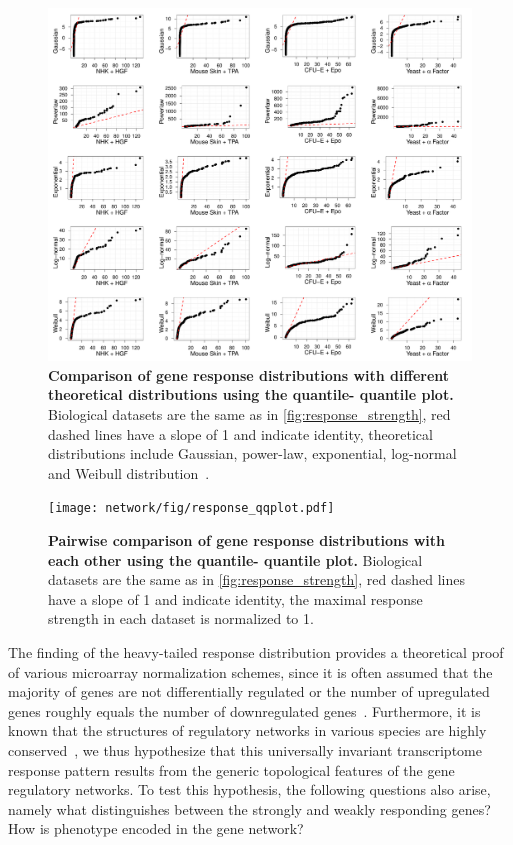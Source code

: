 \begin{figure}[!ht]
\begin{center}
\includegraphics[width=\textwidth]{network/fig/response_fit.pdf}
\end{center}
\caption[Comparison of gene response distributions with
theoretical distributions]{
{\bf Comparison of gene response distributions with 
different theoretical distributions using the quantile-%
quantile plot.}
Biological datasets are the same as in 
\ref{fig:response_strength}, red dashed lines have a slope
of 1 and indicate identity, theoretical distributions 
include Gaussian, power-law, exponential, log-normal and
Weibull distribution~\citep{Clauset2009}.
}
\label{fig:response_fit}
\end{figure}

\begin{figure}[!ht]
\begin{center}
\texttt{[image: network/fig/response\_qqplot.pdf]}
\end{center}
\caption[Comparison of gene response distributions]{
{\bf Pairwise comparison of gene response distributions with 
each other using the quantile-%
quantile plot.} 
Biological datasets are the same as in 
\ref{fig:response_strength}, red dashed lines have a slope
of 1 and indicate identity, the maximal response strength
in each dataset is normalized to 1.
}
\label{fig:response_qqplot}
\end{figure}

The finding of the heavy-tailed response distribution provides a theoretical
proof of various microarray normalization schemes, since it is often assumed
that the majority of 
genes are not differentially regulated or the number of upregulated genes 
roughly equals the number of downregulated genes~\citep{Do2006}.
Furthermore, it is known that the structures of
regulatory networks in various species are highly conserved~\citep{Brown2007}, 
we thus hypothesize that this
universally invariant transcriptome response pattern results from the generic
topological features of the gene regulatory networks. To test this hypothesis,
the following questions also
arise, namely what distinguishes 
between the strongly and weakly responding genes? How is phenotype encoded 
in the gene network?


